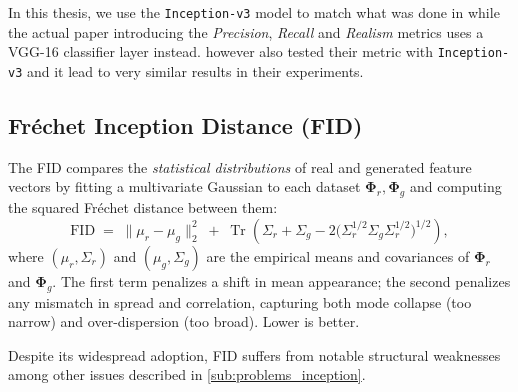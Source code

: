 \begin{tcolorbox}[colback=gray!10!white,colframe=gray!50!black,sharp corners]
In this thesis, we use the \texttt{Inception-v3} model to match what was done in \cite{jazbec_generative_2025} while the actual paper introducing the \emph{Precision}, \emph{Recall} and \emph{Realism} metrics \parencite{kynkaanniemi_improved_2019} uses a VGG-16 classifier layer instead. \cite{kynkaanniemi_improved_2019} however also tested their metric with \texttt{Inception-v3} and it lead to very similar results in their experiments.
\end{tcolorbox}

\subsection{Fréchet Inception Distance (FID)}
\label{subsec:fid}

The FID \cite{heusel_gans_2018} compares the \emph{statistical distributions} of
real and generated feature vectors by fitting a multivariate Gaussian to each
dataset $\boldsymbol{\Phi}_r,\boldsymbol{\Phi}_g$ and computing the squared Fréchet distance between them:
%
\begin{equation}
  \label{eq:fid}
  \mathrm{FID}
  \;=\;
  \|\mu_{r} - \mu_{g}\|_{2}^{2}
  \;+\;
  \operatorname{Tr}\!\left(
    \Sigma_{r} + \Sigma_{g}
    - 2\bigl(\Sigma_{r}^{1/2}\Sigma_{g}\Sigma_{r}^{1/2}\bigr)^{1/2}
  \right),
\end{equation}
%
where $(\mu_{r}, \Sigma_{r})$ and $(\mu_{g}, \Sigma_{g})$ are the empirical
means and covariances of $\boldsymbol{\Phi}_{r}$ and $\boldsymbol{\Phi}_{g}$.
The first term penalizes a shift in mean appearance; the second penalizes any mismatch in spread and correlation, capturing both mode collapse (too narrow) and over-dispersion (too broad).
Lower is better.
 

\begin{tcolorbox}[colback=orange!10!white,colframe=orange!50!black,sharp corners]
Despite its widespread adoption, \acs{FID} suffers from notable structural weaknesses \parencite{jayasumana_rethinking_2024} among other issues described in \autoref{sub:problems_inception}.
\end{tcolorbox}

